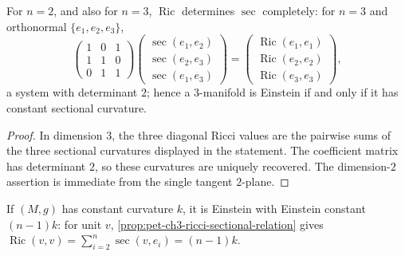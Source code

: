 \begin{corollary}
  \label{cor:pet-ch3-ricci-determines-sec-low-dim}


  For $n=2$, and also for $n=3$, $\operatorname{Ric}$ determines $\sec$
  completely: for $n=3$ and orthonormal $\{e_1,e_2,e_3\}$,
  \[
    \begin{pmatrix}1&0&1\\1&1&0\\0&1&1\end{pmatrix}
    \begin{pmatrix}\sec(e_1,e_2)\\\sec(e_2,e_3)\\\sec(e_1,e_3)\end{pmatrix}
    =\begin{pmatrix}\operatorname{Ric}(e_1,e_1)\\\operatorname{Ric}(e_2,e_2)\\\operatorname{Ric}(e_3,e_3)\end{pmatrix},
  \]
  a system with determinant $2$; hence a $3$-manifold is Einstein if and only
  if it has constant sectional curvature.
\end{corollary}
\begin{proof}

  \sketch
  In dimension $3$, the three diagonal Ricci values are the pairwise sums of
  the three sectional curvatures displayed in the statement. The coefficient
  matrix has determinant $2$, so these curvatures are uniquely recovered. The
  dimension-$2$ assertion is immediate from the single tangent $2$-plane.
\end{proof}

\begin{remark}
  \label{rem:pet-ch3-constant-curvature-einstein}


  \sketch
  If $(M,g)$ has constant curvature $k$, it is Einstein with Einstein constant
  $(n-1)k$: for unit $v$, \cref{prop:pet-ch3-ricci-sectional-relation} gives
  $\operatorname{Ric}(v,v)=\sum_{i=2}^n\sec(v,e_i)=(n-1)k$.
\end{remark}

